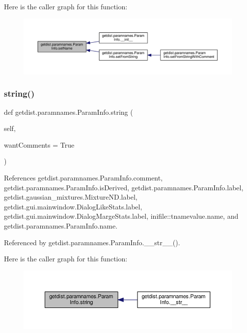 Here is the caller graph for this function\+:
\nopagebreak
\begin{figure}[H]
\begin{center}
\leavevmode
\includegraphics[width=350pt]{classgetdist_1_1paramnames_1_1ParamInfo_aac1142515954029d6c6039eab3e42f46_icgraph}
\end{center}
\end{figure}
\mbox{\label{classgetdist_1_1paramnames_1_1ParamInfo_aae31c25dc1dba70255c2d388bd49d742}} 
\subsubsection{\texorpdfstring{string()}{string()}}
{\footnotesize\ttfamily def getdist.\+paramnames.\+Param\+Info.\+string (\begin{DoxyParamCaption}\item[{}]{self,  }\item[{}]{want\+Comments = {\ttfamily True} }\end{DoxyParamCaption})}



References getdist.\+paramnames.\+Param\+Info.\+comment, getdist.\+paramnames.\+Param\+Info.\+is\+Derived, getdist.\+paramnames.\+Param\+Info.\+label, getdist.\+gaussian\+\_\+mixtures.\+Mixture\+N\+D.\+label, getdist.\+gui.\+mainwindow.\+Dialog\+Like\+Stats.\+label, getdist.\+gui.\+mainwindow.\+Dialog\+Marge\+Stats.\+label, inifile\+::tnamevalue.\+name, and getdist.\+paramnames.\+Param\+Info.\+name.



Referenced by getdist.\+paramnames.\+Param\+Info.\+\_\+\+\_\+str\+\_\+\+\_\+().

Here is the caller graph for this function\+:
\nopagebreak
\begin{figure}[H]
\begin{center}
\leavevmode
\includegraphics[width=350pt]{classgetdist_1_1paramnames_1_1ParamInfo_aae31c25dc1dba70255c2d388bd49d742_icgraph}
\end{center}
\end{figure}


